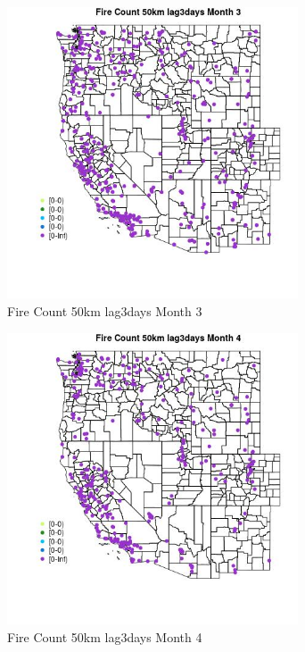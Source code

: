 \begin{figure} 
\centering  
\includegraphics[width=0.77\textwidth]{Code_Outputs/Report_ML_input_PM25_Step4_part_e_de_duplicated_aves_compiled_2019-05-18wNAs_MapObsMo3Fire_Count_50km_lag3days.jpg} 
\caption{\label{fig:Report_ML_input_PM25_Step4_part_e_de_duplicated_aves_compiled_2019-05-18wNAsMapObsMo3Fire_Count_50km_lag3days}Fire Count 50km lag3days Month 3} 
\end{figure} 
 

\begin{figure} 
\centering  
\includegraphics[width=0.77\textwidth]{Code_Outputs/Report_ML_input_PM25_Step4_part_e_de_duplicated_aves_compiled_2019-05-18wNAs_MapObsMo4Fire_Count_50km_lag3days.jpg} 
\caption{\label{fig:Report_ML_input_PM25_Step4_part_e_de_duplicated_aves_compiled_2019-05-18wNAsMapObsMo4Fire_Count_50km_lag3days}Fire Count 50km lag3days Month 4} 
\end{figure} 
 

